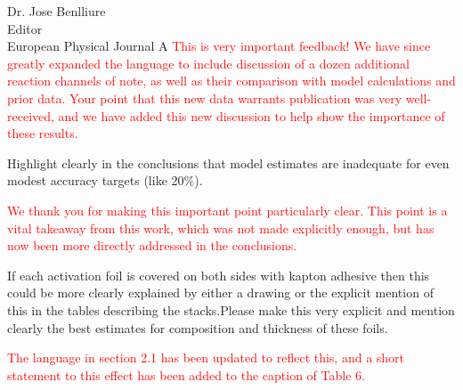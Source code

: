\documentclass{letter} %
\newcommand{\colornote}[1]{\textcolor{red}{#1}}
\begin{document}
\begin{letter}{Dr. Jose Benlliure \\
Editor \\
European Physical Journal A}
\colornote{This is very important feedback! We have since greatly expanded the language to include discussion of a dozen additional reaction channels of note, as well as their comparison with model calculations and prior data. Your point that this new data warrants publication was very well-received, and we have added this new discussion to help show the importance of these results.}


Highlight clearly in the conclusions that model estimates are inadequate for even modest accuracy targets (like 20\%).

\colornote{We thank you for making this important point particularly clear. This point is a vital takeaway from this work, which was not made explicitly enough, but has now been more directly addressed in the conclusions.}

If each activation foil is covered on both sides with kapton adhesive then this could be more clearly explained by either a drawing or the explicit mention of this in the tables describing the stacks.Please make this very explicit and mention clearly the best estimates for composition and thickness of these foils.

\colornote{The language in section 2.1 has been updated to reflect this, and a short statement to this effect has been added to the caption of Table 6.}

 

 

\end{letter}
 
\end{document}
